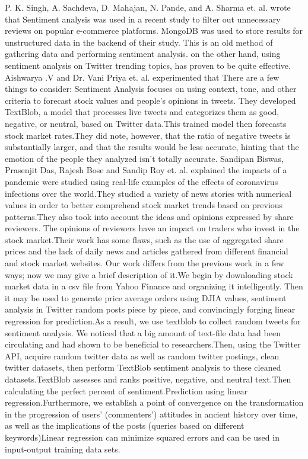 P. K. Singh, A. Sachdeva, D. Mahajan, N. Pande, and A. Sharma et. al.\cite{singh2014approach} wrote that Sentiment analysis was used in a recent study to filter out unnecessary reviews on popular e-commerce platforms. MongoDB was used to store results for unstructured data in the backend of their study. This is an old method of gathering data and performing sentiment analysis. on the other hand, using sentiment analysis on Twitter trending topics, has proven to be quite effective. Aishwarya .V  and Dr. Vani Priya et. al. \cite{prasadinternational} experimented that There are a few things to consider: Sentiment Analysis focuses on using context, tone, and other criteria to forecast stock values and people's opinions in tweets. They developed TextBlob, a model that processes live tweets and categorizes them as good, negative, or neutral, based on Twitter data.This trained model then forecasts stock market rates.They did note, however, that the ratio of negative tweets is substantially larger, and that the results would be less accurate, hinting that the emotion of the people they analyzed isn't totally accurate.
Sandipan Biswas, Prasenjit Das, Rajesh Bose and Sandip Roy et. al.\cite{biswas2020examining} explained the impacts of a pandemic were studied using real-life examples of the effects of coronavirus infections over the world.They studied a variety of news stories with numerical values in order to better comprehend stock market trends based on previous patterns.They also took into account the ideas and opinions expressed by share reviewers. The opinions of reviewers have an impact on traders who invest in the stock market.Their work has some flaws, such as the use of aggregated share prices and the lack of daily news and articles gathered from different financial and stock market websites.
Our work differs from the previous work in a few ways; now we may give a brief description of it.We begin by downloading stock market data in a csv file from Yahoo Finance and organizing it intelligently. Then it may be used to generate price average orders using DJIA values, sentiment analysis in Twitter random posts piece by piece, and convincingly forging linear regression for prediction.As a result, we use textblob to collect random tweets for sentiment analysis. We noticed that a big amount of text-file data had been circulating and had shown to be beneficial to researchers.Then, using the Twitter API, acquire random twitter data as well as random twitter postings, clean twitter datasets, then perform TextBlob sentiment analysis to these cleaned datasets.TextBlob assesses and ranks positive, negative, and neutral text.Then calculating the perfect percent of sentiment.Prediction using linear regression.Furthermore, we establish a point of convergence on the transformation in the progression of users' (commenters') attitudes in ancient history over time, as well as the implications of the posts (queries based on different keywords)Linear regression can minimize squared errors and can be used in input-output training data sets.\\